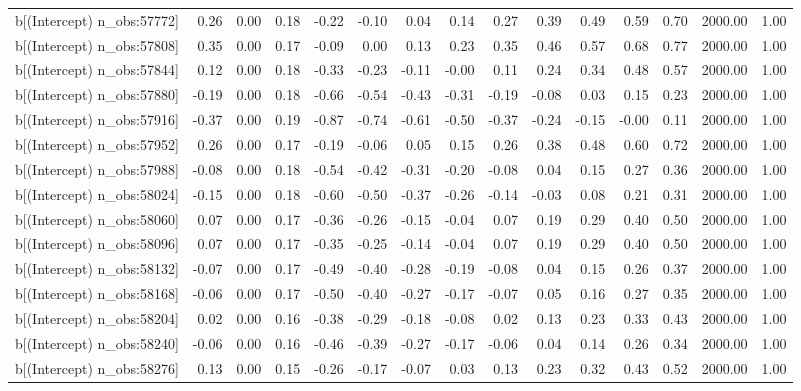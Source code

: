 \begin{table}[ht]
\begin{tabular}{rrrrrrrrrrrrrrr}
  b[(Intercept) n\_obs:57772] & 0.26 & 0.00 & 0.18 & -0.22 & -0.10 & 0.04 & 0.14 & 0.27 & 0.39 & 0.49 & 0.59 & 0.70 & 2000.00 & 1.00 \\ 
  b[(Intercept) n\_obs:57808] & 0.35 & 0.00 & 0.17 & -0.09 & 0.00 & 0.13 & 0.23 & 0.35 & 0.46 & 0.57 & 0.68 & 0.77 & 2000.00 & 1.00 \\ 
  b[(Intercept) n\_obs:57844] & 0.12 & 0.00 & 0.18 & -0.33 & -0.23 & -0.11 & -0.00 & 0.11 & 0.24 & 0.34 & 0.48 & 0.57 & 2000.00 & 1.00 \\ 
  b[(Intercept) n\_obs:57880] & -0.19 & 0.00 & 0.18 & -0.66 & -0.54 & -0.43 & -0.31 & -0.19 & -0.08 & 0.03 & 0.15 & 0.23 & 2000.00 & 1.00 \\ 
  b[(Intercept) n\_obs:57916] & -0.37 & 0.00 & 0.19 & -0.87 & -0.74 & -0.61 & -0.50 & -0.37 & -0.24 & -0.15 & -0.00 & 0.11 & 2000.00 & 1.00 \\ 
  b[(Intercept) n\_obs:57952] & 0.26 & 0.00 & 0.17 & -0.19 & -0.06 & 0.05 & 0.15 & 0.26 & 0.38 & 0.48 & 0.60 & 0.72 & 2000.00 & 1.00 \\ 
  b[(Intercept) n\_obs:57988] & -0.08 & 0.00 & 0.18 & -0.54 & -0.42 & -0.31 & -0.20 & -0.08 & 0.04 & 0.15 & 0.27 & 0.36 & 2000.00 & 1.00 \\ 
  b[(Intercept) n\_obs:58024] & -0.15 & 0.00 & 0.18 & -0.60 & -0.50 & -0.37 & -0.26 & -0.14 & -0.03 & 0.08 & 0.21 & 0.31 & 2000.00 & 1.00 \\ 
  b[(Intercept) n\_obs:58060] & 0.07 & 0.00 & 0.17 & -0.36 & -0.26 & -0.15 & -0.04 & 0.07 & 0.19 & 0.29 & 0.40 & 0.50 & 2000.00 & 1.00 \\ 
  b[(Intercept) n\_obs:58096] & 0.07 & 0.00 & 0.17 & -0.35 & -0.25 & -0.14 & -0.04 & 0.07 & 0.19 & 0.29 & 0.40 & 0.50 & 2000.00 & 1.00 \\ 
  b[(Intercept) n\_obs:58132] & -0.07 & 0.00 & 0.17 & -0.49 & -0.40 & -0.28 & -0.19 & -0.08 & 0.04 & 0.15 & 0.26 & 0.37 & 2000.00 & 1.00 \\ 
  b[(Intercept) n\_obs:58168] & -0.06 & 0.00 & 0.17 & -0.50 & -0.40 & -0.27 & -0.17 & -0.07 & 0.05 & 0.16 & 0.27 & 0.35 & 2000.00 & 1.00 \\ 
  b[(Intercept) n\_obs:58204] & 0.02 & 0.00 & 0.16 & -0.38 & -0.29 & -0.18 & -0.08 & 0.02 & 0.13 & 0.23 & 0.33 & 0.43 & 2000.00 & 1.00 \\ 
  b[(Intercept) n\_obs:58240] & -0.06 & 0.00 & 0.16 & -0.46 & -0.39 & -0.27 & -0.17 & -0.06 & 0.04 & 0.14 & 0.26 & 0.34 & 2000.00 & 1.00 \\ 
  b[(Intercept) n\_obs:58276] & 0.13 & 0.00 & 0.15 & -0.26 & -0.17 & -0.07 & 0.03 & 0.13 & 0.23 & 0.32 & 0.43 & 0.52 & 2000.00 & 1.00 \\ 

\end{tabular}
\end{table}
